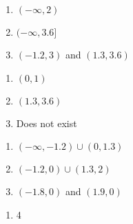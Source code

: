 \begin{multicols}{3}
\begin{enumerate}	\setcounter{enumi}{\value{Review}} 
    \item $(-\infty, 2)$
	\item $(-\infty, 3.6]$
	\item $(-1.2,3)$ and $(1.3,3.6)$
\end{enumerate}	\setcounter{Review}{\value{enumi}}
\end{multicols}
\begin{multicols}{3}
\begin{enumerate}	\setcounter{enumi}{\value{Review}} 
	\item $(0,1)$
	\item $(1.3,3.6)$
	\item Does not exist
\end{enumerate}	\setcounter{Review}{\value{enumi}}
\end{multicols}
\begin{multicols}{3}
\begin{enumerate}	\setcounter{enumi}{\value{Review}} 
	\item $(-\infty, -1.2) \cup (0,1.3)$
	\item $(-1.2, 0) \cup (1.3,2)$
	\item $(-1.8,0)$ and $(1.9,0)$
\end{enumerate}	\setcounter{Review}{\value{enumi}}
\end{multicols}
\begin{multicols}{3}
\begin{enumerate}	\setcounter{enumi}{\value{Review}} 
	\item 4
\end{enumerate}
\end{multicols}